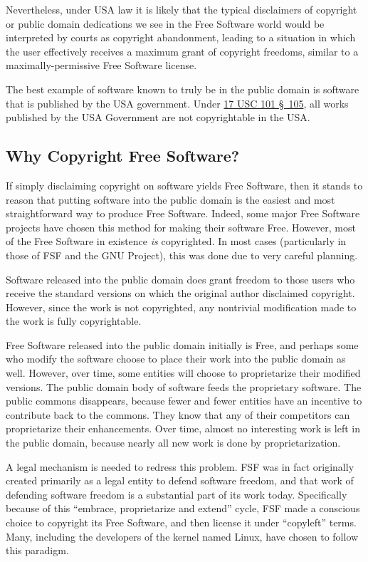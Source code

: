 Nevertheless, under USA law it is likely that the typical
disclaimers of copyright or public domain dedications we see in the
Free Software world would be interpreted by courts as copyright
abandonment, leading to a situation in which the user effectively receives a
maximum grant of copyright freedoms, similar to a maximally-permissive
Free Software license.

The best example of software known to truly be in the public domain is software
that is published by the USA government.  Under
\href{http://www.law.cornell.edu/uscode/text/17/105}{17 USC 101 \S~105}, all
works published by the USA Government are not copyrightable in the USA.

\subsection{Why Copyright Free Software?}

If simply disclaiming copyright on software yields Free Software, then it
stands to reason that putting software into the public domain is the
easiest and most straightforward way to produce Free Software. Indeed,
some major Free Software projects have chosen this method for making their
software Free. However, most of the Free Software in existence \emph{is}
copyrighted. In most cases (particularly in those of FSF and the GNU
Project), this was done due to very careful planning.

Software released into the public domain does grant freedom to those users
who receive the standard versions on which the original author disclaimed
copyright. However, since the work is not copyrighted, any nontrivial
modification made to the work is fully copyrightable.

Free Software released into the public domain initially is Free, and
perhaps some who modify the software choose to place their work into the
public domain as well. However, over time, some entities will choose to
proprietarize their modified versions. The public domain body of software
feeds the proprietary software. The public commons disappears, because
fewer and fewer entities have an incentive to contribute back to the
commons. They know that any of their competitors can proprietarize their
enhancements. Over time, almost no interesting work is left in the public
domain, because nearly all new work is done by proprietarization.

A legal mechanism is needed to redress this problem. FSF was in fact
originally created primarily as a legal entity to defend software freedom,
and that work of defending software freedom is a substantial part of
its work today. Specifically because of this ``embrace, proprietarize and
extend'' cycle, FSF made a conscious choice to copyright its Free Software,
and then license it under ``copyleft'' terms. Many, including the
developers of the kernel named Linux, have chosen to follow this paradigm.

